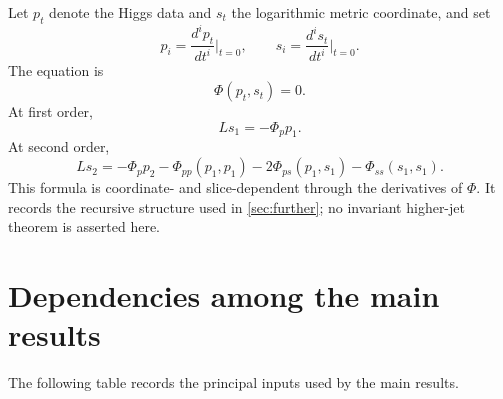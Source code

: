 \documentclass[11pt,reqno]{amsart}
\theoremstyle{definition}
\theoremstyle{remark}
\begin{document}
Let $p_t$ denote the Higgs data and $s_t$ the logarithmic metric coordinate, and set
\[
  p_i=\frac{d^ip_t}{dt^i}\bigg|_{t=0},
  \qquad
  s_i=\frac{d^is_t}{dt^i}\bigg|_{t=0}.
\]
The equation is
\[
  \Phi(p_t,s_t)=0.
\]
At first order,
\[
  Ls_1=-\Phi_p p_1.
\]
At second order,
\begin{equation}\label{eq:second-derivative-app}
  Ls_2
  =-\Phi_pp_2
  -\Phi_{pp}(p_1,p_1)
  -2\Phi_{ps}(p_1,s_1)
  -\Phi_{ss}(s_1,s_1).
\end{equation}
This formula is coordinate- and slice-dependent through the derivatives of $\Phi$.  It records the recursive structure used in \cref{sec:further}; no invariant higher-jet theorem is asserted here.

\section{Dependencies among the main results}\label{app:dependency}

The following table records the principal inputs used by the main results.
\end{document}
